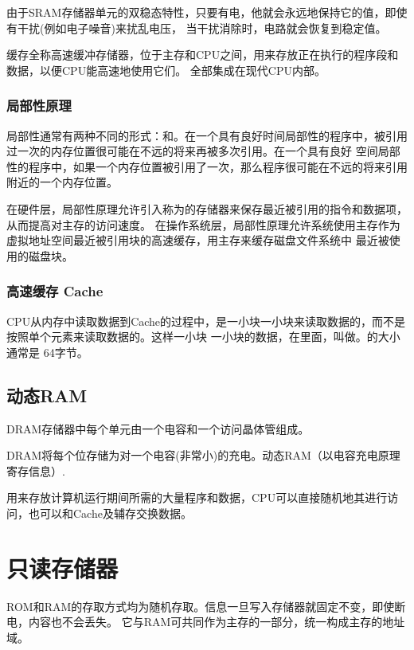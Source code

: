 \documentclass{template}
\begin{document}
        由于SRAM存储器单元的双稳态特性，只要有电，他就会永远地保持它的值，即使有干扰(例如电子噪音)来扰乱电压，
        当干扰消除时，电路就会恢复到稳定值。

        缓存全称高速缓冲存储器，位于主存和CPU之间，用来存放正在执行的程序段和数据，以便CPU能高速地使用它们。
        全部集成在现代CPU内部。

    \subsubsection{局部性原理}
        局部性通常有两种不同的形式：和。在一个具有良好时间局部性的程序中，被引用过一次的内存位置很可能在不远的将来再被多次引用。在一个具有良好
        空间局部性的程序中，如果一个内存位置被引用了一次，那么程序很可能在不远的将来引用附近的一个内存位置。

        在硬件层，局部性原理允许引入称为的存储器来保存最近被引用的指令和数据项，从而提高对主存的访问速度。
        在操作系统层，局部性原理允许系统使用主存作为虚拟地址空间最近被引用块的高速缓存，用主存来缓存磁盘文件系统中
        最近被使用的磁盘块。




    \subsubsection{高速缓存 Cache}
        CPU从内存中读取数据到Cache的过程中，是一小块一小块来读取数据的，而不是按照单个元素来读取数据的。这样一小块
        一小块的数据，在里面，叫做。的大小通常是
        64字节。






    \subsection{动态RAM}
        DRAM存储器中每个单元由一个电容和一个访问晶体管组成。

        DRAM将每个位存储为对一个电容(非常小)的充电。动态RAM（以电容充电原理寄存信息）.

        用来存放计算机运行期间所需的大量程序和数据，CPU可以直接随机地其进行访问，也可以和Cache及辅存交换数据。




\section{只读存储器}
    ROM和RAM的存取方式均为随机存取。信息一旦写入存储器就固定不变，即使断电，内容也不会丢失。
    它与RAM可共同作为主存的一部分，统一构成主存的地址域。
\end{document}
